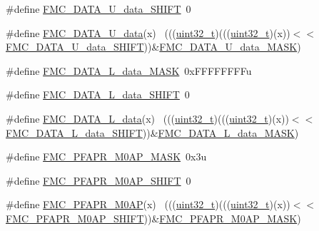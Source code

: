\begin{DoxyCompactItemize}
\#define \hyperlink{group___f_m_c___register___masks_gaa7a3b8bfa7aac03f2eef0b5e58dfbb44}{F\+M\+C\+\_\+\+D\+A\+T\+A\+\_\+\+U\+\_\+data\+\_\+\+S\+H\+I\+FT}~0
\item 
\#define \hyperlink{group___f_m_c___register___masks_gaaff6334ea97d75b928e57b18784450ba}{F\+M\+C\+\_\+\+D\+A\+T\+A\+\_\+\+U\+\_\+data}(x)                                          ~(((\hyperlink{_p_e___types_8h_a33594304e786b158f3fb30289278f5af}{uint32\+\_\+t})(((\hyperlink{_p_e___types_8h_a33594304e786b158f3fb30289278f5af}{uint32\+\_\+t})(x))$<$$<$\hyperlink{group___f_m_c___register___masks_gaa7a3b8bfa7aac03f2eef0b5e58dfbb44}{F\+M\+C\+\_\+\+D\+A\+T\+A\+\_\+\+U\+\_\+data\+\_\+\+S\+H\+I\+FT}))\&\hyperlink{group___f_m_c___register___masks_gae43292c4f0149b2bc25d115b7f5a6ee9}{F\+M\+C\+\_\+\+D\+A\+T\+A\+\_\+\+U\+\_\+data\+\_\+\+M\+A\+SK})
\item 
\#define \hyperlink{group___f_m_c___register___masks_gaefcb45152ed3dc9c4ac7b353f4eab44b}{F\+M\+C\+\_\+\+D\+A\+T\+A\+\_\+\+L\+\_\+data\+\_\+\+M\+A\+SK}~0x\+F\+F\+F\+F\+F\+F\+F\+Fu
\item 
\#define \hyperlink{group___f_m_c___register___masks_gabef8366f6d036877a0600a2594f08bfb}{F\+M\+C\+\_\+\+D\+A\+T\+A\+\_\+\+L\+\_\+data\+\_\+\+S\+H\+I\+FT}~0
\item 
\#define \hyperlink{group___f_m_c___register___masks_ga42e9ba3dd387406fe69e41f80a1ad70f}{F\+M\+C\+\_\+\+D\+A\+T\+A\+\_\+\+L\+\_\+data}(x)                                          ~(((\hyperlink{_p_e___types_8h_a33594304e786b158f3fb30289278f5af}{uint32\+\_\+t})(((\hyperlink{_p_e___types_8h_a33594304e786b158f3fb30289278f5af}{uint32\+\_\+t})(x))$<$$<$\hyperlink{group___f_m_c___register___masks_gabef8366f6d036877a0600a2594f08bfb}{F\+M\+C\+\_\+\+D\+A\+T\+A\+\_\+\+L\+\_\+data\+\_\+\+S\+H\+I\+FT}))\&\hyperlink{group___f_m_c___register___masks_gaefcb45152ed3dc9c4ac7b353f4eab44b}{F\+M\+C\+\_\+\+D\+A\+T\+A\+\_\+\+L\+\_\+data\+\_\+\+M\+A\+SK})
\item 
\#define \hyperlink{group___f_m_c___register___masks_gac1ee4a2aca52fe6f68d05ce0b43dd6b8}{F\+M\+C\+\_\+\+P\+F\+A\+P\+R\+\_\+\+M0\+A\+P\+\_\+\+M\+A\+SK}~0x3u
\item 
\#define \hyperlink{group___f_m_c___register___masks_gaff9b97ca7b6e58fe7aa92c088e2f2fe1}{F\+M\+C\+\_\+\+P\+F\+A\+P\+R\+\_\+\+M0\+A\+P\+\_\+\+S\+H\+I\+FT}~0
\item 
\#define \hyperlink{group___f_m_c___register___masks_ga1c6e41857222a850ea33adcc2d81fa2d}{F\+M\+C\+\_\+\+P\+F\+A\+P\+R\+\_\+\+M0\+AP}(x)                                            ~(((\hyperlink{_p_e___types_8h_a33594304e786b158f3fb30289278f5af}{uint32\+\_\+t})(((\hyperlink{_p_e___types_8h_a33594304e786b158f3fb30289278f5af}{uint32\+\_\+t})(x))$<$$<$\hyperlink{group___f_m_c___register___masks_gaff9b97ca7b6e58fe7aa92c088e2f2fe1}{F\+M\+C\+\_\+\+P\+F\+A\+P\+R\+\_\+\+M0\+A\+P\+\_\+\+S\+H\+I\+FT}))\&\hyperlink{group___f_m_c___register___masks_gac1ee4a2aca52fe6f68d05ce0b43dd6b8}{F\+M\+C\+\_\+\+P\+F\+A\+P\+R\+\_\+\+M0\+A\+P\+\_\+\+M\+A\+SK})
$$
\end{DoxyCompactItemize}
